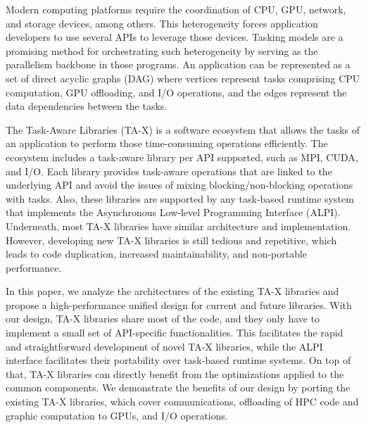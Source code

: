 Modern computing platforms require the coordination of CPU, GPU, network, and storage devices, among others. This heterogeneity forces application developers to use several APIs to leverage those devices. Tasking models are a promising method for orchestrating such heterogeneity by serving as the parallelism backbone in those programs. An application can be represented as a set of direct acyclic graphs (DAG) where vertices represent tasks comprising CPU computation, GPU offloading, and I/O operations, and the edges represent the data dependencies between the tasks.

The Task-Aware Libraries (TA-X) is a software ecosystem that allows the tasks of an application to perform those time-consuming operations efficiently. The ecosystem includes a task-aware library per API supported, such as MPI, CUDA, and I/O. Each library provides task-aware operations that are linked to the underlying API and avoid the issues of mixing blocking/non-blocking operations with tasks. Also, these libraries are supported by any task-based runtime system that implements the Asynchronous Low-level Programming Interface (ALPI). Underneath, most TA-X libraries have similar architecture and implementation. However, developing new TA-X libraries is still tedious and repetitive, which leads to code duplication, increased maintainability, and non-portable performance.

In this paper, we analyze the architectures of the existing TA-X libraries and propose a high-performance unified design for current and future libraries. With our design, TA-X libraries share most of the code, and they only have to implement a small set of API-specific functionalities. This facilitates the rapid and straightforward development of novel TA-X libraries, while the ALPI interface facilitates their portability over task-based runtime systems. On top of that, TA-X libraries can directly benefit from the optimizations applied to the common components. We demonstrate the benefits of our design by porting the existing TA-X libraries, which cover communications, offloading of HPC code and graphic computation to GPUs, and I/O operations.
